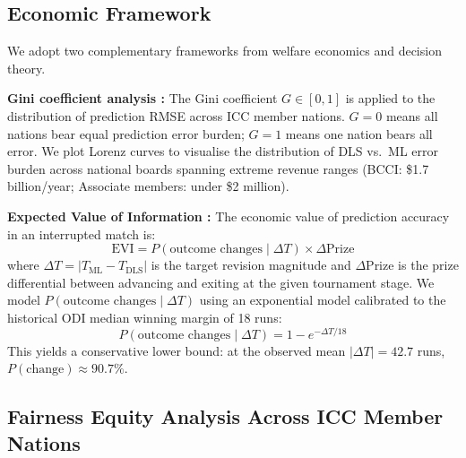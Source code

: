 \documentclass[10pt,a4paper,twocolumn]{article}
\begin{document}
\subsection{Economic Framework}

We adopt two complementary frameworks from welfare economics and decision theory.

\textbf{Gini coefficient analysis \citep{Gini1912}:} The Gini coefficient $G \in [0,1]$ is applied to the distribution of prediction RMSE across ICC member nations. $G=0$ means all nations bear equal prediction error burden; $G=1$ means one nation bears all error. We plot Lorenz curves to visualise the distribution of DLS vs.\ ML error burden across national boards spanning extreme revenue ranges (BCCI: \$1.7 billion/year; Associate members: under \$2 million).

\textbf{Expected Value of Information \citep{Howard1966}:} The economic value of prediction accuracy in an interrupted match is:
\begin{equation}
\text{EVI} = P(\text{outcome changes} \mid \Delta T) \times \Delta\text{Prize}
\end{equation}
where $\Delta T = |T_\text{ML} - T_\text{DLS}|$ is the target revision magnitude and $\Delta\text{Prize}$ is the prize differential between advancing and exiting at the given tournament stage. We model $P(\text{outcome changes} \mid \Delta T)$ using an exponential model calibrated to the historical ODI median winning margin of 18 runs:
\begin{equation}
P(\text{outcome changes} \mid \Delta T) = 1 - e^{-\Delta T / 18}
\end{equation}
This yields a conservative lower bound: at the observed mean $|\Delta T| = 42.7$ runs, $P(\text{change}) \approx 90.7\%$.

\subsection{Fairness Equity Analysis Across ICC Member Nations}
\end{document}
